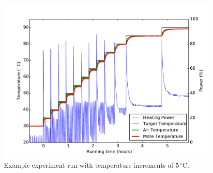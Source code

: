 \begin{figure}[H]
	\centering
    \includegraphics[width=1\columnwidth]{figures/box_heating_step}
	\caption{Example experiment run with temperature increments of $5\,^{\circ}\mathrm{C}$.}
    \label{fig:box_heating_step}
\end{figure} 